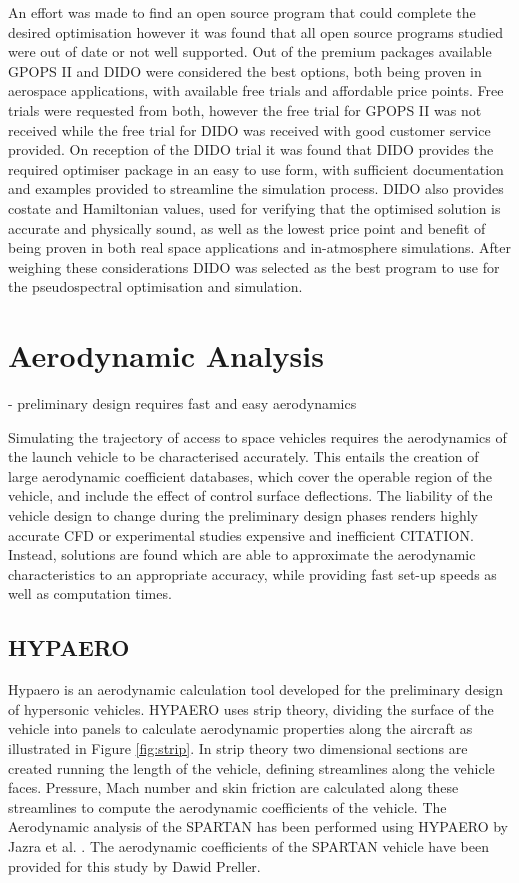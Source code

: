 An effort was made to find an open source program that could complete the desired optimisation however it was found that all open source programs studied were out of date or not well supported. Out of the premium packages available GPOPS II and DIDO were considered the best options, both being proven in aerospace applications, with available free trials and affordable price points. Free trials were requested from both, however the free trial for GPOPS II was not received while the free trial for DIDO was received with good customer service provided. On reception of the DIDO trial it was found that DIDO provides the required optimiser package in an easy to use form, with sufficient documentation and examples provided to streamline the simulation process. DIDO also provides costate and Hamiltonian values, used for verifying that the optimised solution is accurate and physically sound, as well as the lowest price point and benefit of being proven in both real space applications and in-atmosphere simulations. After weighing these considerations DIDO was selected as the best program to use for the pseudospectral optimisation and simulation. 

\section{Aerodynamic Analysis}
- preliminary design requires fast and easy aerodynamics 

Simulating the trajectory of access to space vehicles requires the aerodynamics of the launch vehicle to be characterised accurately. This entails the creation of large aerodynamic coefficient databases, which cover the operable region of the vehicle, and include the effect of control surface deflections. The liability of the vehicle design to change during the preliminary design phases renders highly accurate CFD or experimental studies expensive and inefficient CITATION. Instead, solutions are found which are able to approximate the aerodynamic characteristics to an appropriate accuracy, while providing fast set-up speeds as well as computation times. 

\subsection{HYPAERO}

Hypaero is an aerodynamic calculation tool developed for the preliminary design of hypersonic vehicles. 
HYPAERO uses strip theory, dividing the surface of the vehicle into panels to calculate aerodynamic properties along the aircraft as illustrated in Figure \ref{fig:strip}. In strip theory two dimensional sections are created running the length of the vehicle, defining streamlines along the vehicle faces. Pressure, Mach number and skin friction are calculated along these streamlines to compute the aerodynamic coefficients of the vehicle. The Aerodynamic analysis of the SPARTAN has been performed using HYPAERO by Jazra et al. \cite{Jazra2013}. The aerodynamic coefficients of the SPARTAN vehicle have been provided for this study by Dawid Preller.

